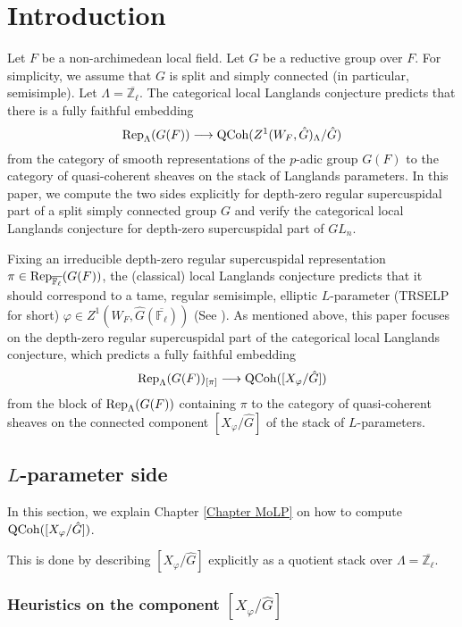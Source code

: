 \chapter{Introduction}

Let $F$ be a non-archimedean local field. Let $G$ be a reductive group over $F$. For simplicity, we assume that $G$ is split and simply connected (in particular, semisimple). Let $\Lambda=\overline{\mathbb{Z}_{\ell}}$. The categorical local Langlands conjecture predicts that there is a fully faithful embedding
$$\operatorname{\operatorname{Rep}}_{\Lambda}(G(F)) \longrightarrow \operatorname{\operatorname{QCoh}}(Z^1(W_F, \hat{G})_{\Lambda}/\hat{G})$$
from the category of smooth representations of the $p$-adic group $G(F)$ to the category of quasi-coherent sheaves on the stack of Langlands parameters. In this paper, we compute the two sides explicitly for depth-zero regular supercuspidal part of a split simply connected group $G$ and verify the categorical local Langlands conjecture for depth-zero supercuspidal part of $GL_n$.

Fixing an irreducible depth-zero regular supercuspidal representation $\pi \in \operatorname{\operatorname{Rep}}_{\overline{\mathbb{F}_{\ell}}}(G(F))$, the (classical) local Langlands conjecture predicts that it should correspond to a tame, regular semisimple, elliptic $L$-parameter (TRSELP for short) $\varphi \in Z^1(W_F, \hat{G}(\overline{\mathbb{F}_{\ell}}))$ (See \cite{debacker2009depth}). As mentioned above, this paper focuses on the depth-zero regular supercuspidal part of the categorical local Langlands conjecture, which predicts a fully faithful embedding
$$\operatorname{\operatorname{Rep}}_{\Lambda}(G(F))_{[\pi]} \longrightarrow \operatorname{\operatorname{QCoh}}([X_{\varphi}/\hat{G}])$$
from the block of $\operatorname{\operatorname{Rep}}_{\Lambda}(G(F))$ containing $\pi$ to the category of quasi-coherent sheaves on the connected component $[X_{\varphi}/\hat{G}]$ of the stack of $L$-parameters.

\section{$L$-parameter side}
In this section, we explain Chapter \ref{Chapter MoLP} on how to compute $\operatorname{\operatorname{QCoh}}([X_{\varphi}/\hat{G}])$. 

This is done by describing $[X_{\varphi}/\hat{G}]$ explicitly as a quotient stack over $\Lambda=\overline{\mathbb{Z}_{\ell}}$. 

\subsection{Heuristics on the component $[X_{\varphi}/\hat{G}]$}

